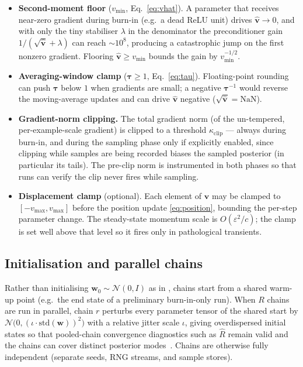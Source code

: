 \documentclass[11pt]{article}
\newcommand{\w}{\mathbf{w}}
\newcommand{\vv}{\mathbf{v}}
\newcommand{\N}{\mathcal{N}}
\newcommand{\vhat}{\hat{\mathbf{v}}}
\newcommand{\btau}{\bm{\tau}}
\begin{document}
\begin{itemize}
  \item \textbf{Second-moment floor} ($v_{\min}$, Eq.~\ref{eq:vhat}).  A
  parameter that receives near-zero gradient during burn-in (e.g.\ a dead
  ReLU unit) drives $\vhat\to 0$, and with only the tiny stabiliser
  $\lambda$ in the denominator the preconditioner gain
  $1/(\sqrt{\vhat}+\lambda)$ can reach $\sim\!10^{8}$, producing a
  catastrophic jump on the first nonzero gradient.  Flooring
  $\vhat \ge v_{\min}$ bounds the gain by $v_{\min}^{-1/2}$.
  \item \textbf{Averaging-window clamp} ($\btau \ge 1$,
  Eq.~\ref{eq:tau}).  Floating-point rounding can push $\btau$ below $1$
  when gradients are small; a negative $\btau^{-1}$ would reverse the
  moving-average updates and can drive $\vhat$ negative
  ($\sqrt{\vhat} = \mathrm{NaN}$).
  \item \textbf{Gradient-norm clipping.}  The total gradient norm (of the
  un-tempered, per-example-scale gradient) is clipped to a threshold
  $\kappa_{\mathrm{clip}}$ --- always during burn-in, and during the sampling
  phase only if explicitly enabled, since clipping while samples are being
  recorded biases the sampled posterior (in particular its tails).  The
  pre-clip norm is instrumented in both phases so that runs can verify the
  clip never fires while sampling.
  \item \textbf{Displacement clamp} (optional).  Each element of $\vv$ may be
  clamped to $[-v_{\mathrm{max}}, v_{\mathrm{max}}]$ before the position
  update \eqref{eq:position}, bounding the per-step parameter change.  The
  steady-state momentum scale is $O(\varepsilon^{2}/c)$; the clamp is set
  well above that level so it fires only in pathological transients.
\end{itemize}

\subsection{Initialisation and parallel chains}

Rather than initialising $\w_0 \sim \N(0,I)$ as in \cite{wu2025}, chains
start from a shared warm-up point (e.g.\ the end state of a preliminary
burn-in-only run).  When $R$ chains are run in parallel, chain $r$ perturbs
every parameter tensor of the shared start by
$\N\bigl(0, (\iota\cdot\mathrm{std}(\w))^{2}\bigr)$ with a relative jitter
scale $\iota$, giving overdispersed initial states so that pooled-chain
convergence diagnostics such as $\widehat R$ remain valid and the chains can
cover distinct posterior modes~\cite{gelman1992}.  Chains are otherwise fully
independent (separate seeds, RNG streams, and sample stores).
\end{document}
